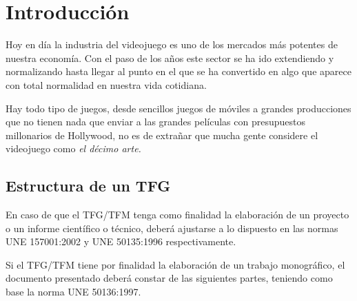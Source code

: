 \chapter{Introducción}

Hoy en día la industria del videojuego es uno de los mercados más potentes de nuestra economía. Con el paso de los años este sector se ha ido extendiendo y normalizando hasta llegar al punto en el que se ha convertido en algo que aparece con total normalidad en nuestra vida cotidiana.

Hay todo tipo de juegos, desde sencillos juegos de móviles a grandes producciones que no tienen nada que enviar a las grandes películas con presupuestos millonarios de Hollywood, no es de extrañar que mucha gente considere el videojuego como \textit{el décimo arte.}

\section{Estructura de un \ac{TFG}}

En caso de que el \ac{TFG}/\acs{TFM} tenga como finalidad la elaboración de un proyecto o un 
informe científico o técnico, deberá ajustarse a lo dispuesto en las normas UNE 
157001:2002 y UNE 50135:1996 respectivamente.

Si el \ac{TFG}/\ac{TFM} tiene por finalidad la elaboración de un trabajo monográfico, el 
documento presentado deberá constar de las siguientes partes, teniendo como base la 
norma UNE 50136:1997.

